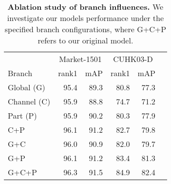 \documentclass{article}
\newcommand{\figcaption}[2]{
\caption{\textbf{#1} #2}
}
\begin{document}
\begin{table}[htbp]
\figcaption{Ablation study of branch influences.}{We investigate our models performance under the specified branch configurations, where G+C+P refers to our original model.}
\label{tab:ablation1}

\centering
\setlength{\tabcolsep}{10pt}
\renewcommand\arraystretch{1.1}
\small

\begin{tabular}{lrrrrr}
\toprule

                                         & \multicolumn{2}{c}{Market-1501} & \multicolumn{2}{c}{CUHK03-D} \\

                                         \cmidrule(lr){2-3} \cmidrule(lr){4-5}
Branch                                   & rank1            & mAP          & rank1             & mAP           \\
\midrule
 Global (G)                                 & 95.4            & 89.3           &       80.8      &    77.3     \\
 Channel (C)                                & 95.9            & 88.8           &       74.7      &    71.2        \\
 Part (P)                                   & 95.9          &   90.2         &       80.3      &    77.9 \\
\midrule
 C+P                                     &  96.1         & 91.2          &  82.7      & 79.8      \\
 G+C                                     &  96.0          & 90.9          &  82.0      & 79.7            \\
 G+P                                     &    96.1         & 91.2          &  83.4      & 81.3             \\
 G+C+P                                   &    96.3        & 91.5           &  84.9      &  82.4           \\
\bottomrule
\end{tabular}
\end{table}
\end{document}
